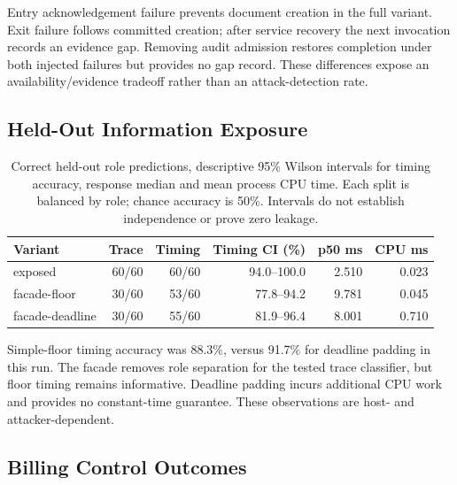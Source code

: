 \documentclass[11pt,a4paper]{article}
\begin{document}
Entry acknowledgement failure prevents document creation in the full variant. Exit failure follows committed creation; after service recovery the next invocation records an evidence gap. Removing audit admission restores completion under both injected failures but provides no gap record. These differences expose an availability/evidence tradeoff rather than an attack-detection rate.


\subsection{Held-Out Information Exposure}

\begin{table}[htbp]
\centering\footnotesize
\begin{tabularx}{\linewidth}{@{}Yrrrrr@{}}
\toprule
Variant & Trace & Timing & Timing CI (\%) & p50 ms & CPU ms \\
\midrule
exposed & 60/60 & 60/60 & 94.0--100.0 & 2.510 & 0.023 \\
facade-floor & 30/60 & 53/60 & 77.8--94.2 & 9.781 & 0.045 \\
facade-deadline & 30/60 & 55/60 & 81.9--96.4 & 8.001 & 0.710 \\
\bottomrule
\end{tabularx}
\caption{Correct held-out role predictions, descriptive 95\% Wilson intervals for timing accuracy, response median and mean process CPU time. Each split is balanced by role; chance accuracy is 50\%. Intervals do not establish independence or prove zero leakage.}\label{tab:leakage}
\end{table}


Simple-floor timing accuracy was 88.3\%, versus 91.7\% for deadline padding in this run. The facade removes role separation for the tested trace classifier, but floor timing remains informative. Deadline padding incurs additional CPU work and provides no constant-time guarantee. These observations are host- and attacker-dependent.


\subsection{Billing Control Outcomes}
\end{document}

